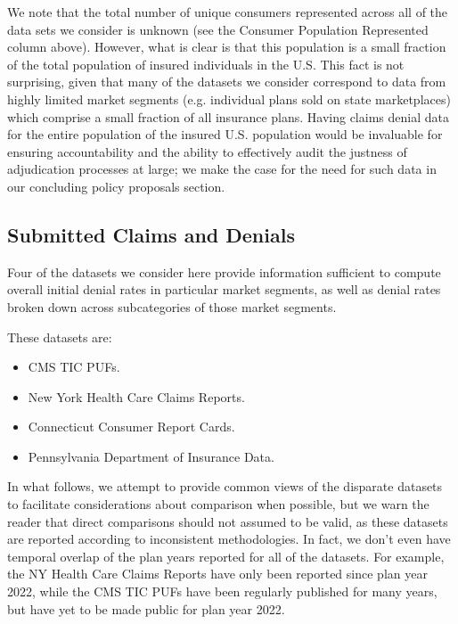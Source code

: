 \documentclass[12pt, a4paper,twoside]{report}
\theoremstyle{plain} %
\theoremstyle{definition} %
\theoremstyle{remark} %
\numberwithin{equation}{chapter}
\begin{document}
		We note that the total number of unique consumers represented across all of the data sets we consider is unknown (see the Consumer Population Represented column above). However, what is clear is that this population is a small fraction of the total population of insured individuals in the U.S. This fact is not surprising, given that many of the datasets we consider correspond to data from highly limited market segments (e.g. individual plans sold on state marketplaces) which comprise a small fraction of all insurance plans. Having claims denial data for the entire population of the insured U.S. population would be invaluable for ensuring accountability and the ability to effectively audit the justness of adjudication processes at large; we make the case for the need for such data in our concluding policy proposals section.\\
		
		\subsection{Submitted Claims and Denials}\label{publicdata:claimsanddenials}
		
		Four of the datasets we consider here provide information sufficient to compute overall initial denial rates in particular market segments, as well as denial rates broken down across subcategories of those market segments.
		
		These datasets are:
		
		\begin{itemize}
			\item CMS TIC PUFs.
			\item New York Health Care Claims Reports.
			\item Connecticut Consumer Report Cards.
			\item Pennsylvania Department of Insurance Data.
		\end{itemize}
		
		In what follows, we attempt to provide common views of the disparate datasets to facilitate considerations about comparison when possible, but we warn the reader that direct comparisons should not assumed to be valid, as these datasets are reported according to inconsistent methodologies. In fact, we don't even have temporal overlap of the plan years reported for all of the datasets. For example, the NY Health Care Claims Reports have only been reported since plan year 2022, while the CMS TIC PUFs have been regularly published for many years, but have yet to be made public for plan year 2022.
		
\end{document}
